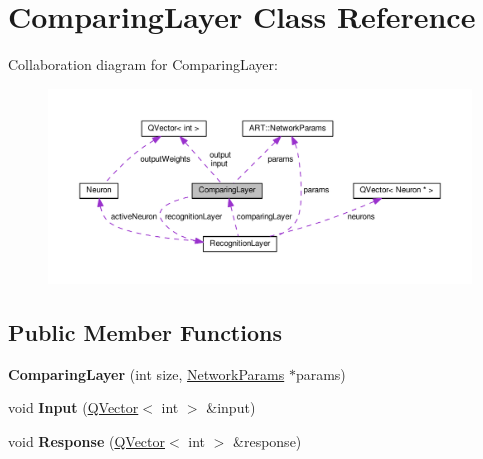 \hypertarget{class_comparing_layer}{}\section{Comparing\+Layer Class Reference}
\label{class_comparing_layer}


Collaboration diagram for Comparing\+Layer\+:\nopagebreak
\begin{figure}[H]
\begin{center}
\leavevmode
\includegraphics[width=350pt]{class_comparing_layer__coll__graph}
\end{center}
\end{figure}
\subsection*{Public Member Functions}
\begin{DoxyCompactItemize}
\item 
{\bfseries Comparing\+Layer} (int size, \hyperlink{struct_a_r_t_1_1_network_params}{Network\+Params} $\ast$params)\hypertarget{class_comparing_layer_ae9e621952f79718c948f31a9569804da}{}\label{class_comparing_layer_ae9e621952f79718c948f31a9569804da}

\item 
void {\bfseries Input} (\hyperlink{class_q_vector}{Q\+Vector}$<$ int $>$ \&input)\hypertarget{class_comparing_layer_a85b9d3ff04a58d2159226e760b9607d0}{}\label{class_comparing_layer_a85b9d3ff04a58d2159226e760b9607d0}

\item 
void {\bfseries Response} (\hyperlink{class_q_vector}{Q\+Vector}$<$ int $>$ \&response)\hypertarget{class_comparing_layer_a7fd6674cdb61903b3ad9428cafcc1c09}{}\label{class_comparing_layer_a7fd6674cdb61903b3ad9428cafcc1c09}

\end{DoxyCompactItemize}
